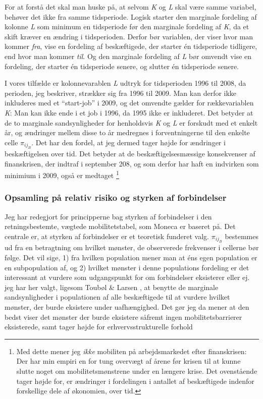 For at forstå det skal man huske på, at selvom \emph{K} og \emph{L} skal være samme variabel, behøver det ikke fra samme tidsperiode. Logisk starter den marginale fordeling af kolonne \emph{L} som minimum en tidsperiode før den marginale fordeling af \emph{K}, da et skift kræver en ændring i tidsperioden. Derfor bør variablen, der viser hvor man kommer \emph{fra}, vise en fordeling af beskæftigede, der starter én tidsperiode tidligere, end hvor man kommer \emph{til}. Og den marginale fordeling af \emph{L} bør omvendt vise en fordeling, der starter én tidsperiode senere, og slutter én tidsperiode senere. 


I vores tilfælde er kolonnevarablen \emph{L} udtryk for tidsperioden 1996 til 2008, da perioden, jeg beskriver, strækker  sig fra 1996 til 2009. Man kan derfor ikke inkluderes med et “start-job” i 2009, og det omvendte gælder for rækkevariablen \emph{K}: Man kan ikke ende i et job i 1996, da 1995 ikke er inkluderet. Det betyder at de to marginale sandsynligheder for henholdsvis \emph{K} og \emph{L} er forskudt med et enkelt år, og ændringer mellem disse to år medregnes i forventningerne til den enkelte celle $\pi_{ij_{B}}$. Det har den fordel, at jeg dermed tager højde for ændringer i beskæftigelsen over tid. Det betyder at de beskæftigelsesmæssige konsekvenser af finanskrisen, der indtraf i september 208, og som derfor har haft en indvirken som minimium i 2009, også er medtaget%
%
		\footnote{ Med dette mener jeg \emph{ikke} mobiliten på arbejdsmarkedet efter finanskrisen: Der har min empiri en for tung overvægt af årene før krisen til at kunne slutte noget om mobilitetsmønstrene under en længere krise. Det ovenstående tager højde for, er ændringer i fordelingen i antallet af beskæftigede indenfor forskellige dele af økonomien, over tid.  }%
%



%
\subsubsection{Opsamling på relativ risiko og styrken af forbindelser}
%

Jeg har redegjort for principperne bag styrken af forbindelser i den retningsbestemte, vægtede mobilitetstabel, som Moneca er baseret på. Det centrale er, at styrken af forbindelser er et teoretisk funderet valg. $\pi_{ij_{B}}$ bestemmes ud fra en betragtning om hvilket mønster, de observerede frekvenser i cellerne bør følge. Det vil sige, 1) fra hvilken population mener man at éns egen population er en subpopulation af, og 2) hvilket mønster i denne populations fordeling er det interessant at vurdere som udgangspunkt for om forbindelser eksisterer eller ej.  jeg har her valgt, ligesom Toubøl \& Larsen \parencite[8]{Touboel2015}, at benytte de marginale sandsynligheder i populationen af alle beskæftigede til at vurdere hvilket mønster, der burde eksistere under uafhængighed. Det gør jeg da mener at den bedst viser det mønster der burde eksistere såfremt ingen mobilitetsbarrierer eksisterede, samt tager højde for erhvervsstrukturelle forhold

